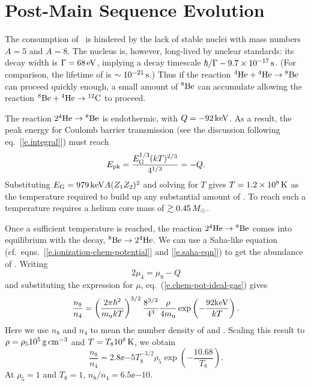 \chapter{Post-Main Sequence Evolution}

The consumption of \helium\ is hindered by the lack of stable nuclei with mass numbers $A=5$ and $A=8$.  
The nucleus \beryllium[8] is, however, long-lived by nuclear standards: its decay width is $\Gamma = 68\nsp\eV$, implying a decay timescale $\hbar/\Gamma - 9.7\ee{-17}\nsp\second$.  (For comparison, the lifetime of \lithium[5] is $\sim 10^{-21}\nsp\second$.)  Thus if the reaction $\helium[4]+\helium[4]\to\beryllium[8]$ can proceed quickly enough, a small amount of $\beryllium[8]$ can accumulate allowing the reaction $\beryllium[8]+\helium\to\carbon$ to proceed.

The reaction $2\helium\to\beryllium[8]$ is endothermic, with $Q = -92\nsp\keV$.  As a result, the peak energy for Coulomb barrier transmission (see the discussion following eq.~[\ref{e.integral}]) must reach
\[ \Epk = \frac{\EG^{1/3}(kT)^{2/3}}{4^{1/3}} = -Q. \]
Substituting $\EG = 979\nsp\keV A (Z_{1}Z_{2})^{2}$ and solving for $T$ gives $T = 1.2\ee{8}\nsp\K$ as the temperature required to build up any substantial amount of \beryllium[8].  To reach such a temperature requires a helium core mass of $\gtrsim 0.45\nsp\Msun$.

Once a sufficient temperature is reached, the reaction $2\helium[4]\to\beryllium[8]$ comes into equilibrium with the decay, $\beryllium[8]\to2\helium$.  We can use a Saha-like equation (cf.\ eqns.~[\ref{e.ionization-chem-potential}] and [\ref{e.saha-eqn}]) to get the abundance of \beryllium[8].  Writing
\[ 2\mu_{4} = \mu_{8} - Q \]
and substituting the expression for $\mu$, eq.~(\ref{e.chem-pot-ideal-gas}) gives
\begin{equation}\label{e.n8-n4}
\frac{n_{8}}{n_{4}} = \left(\frac{2\pi\hbar^{2}}{\mb kT}\right)^{3/2}\frac{8^{3/2}}{4^{3}}\frac{\rho}{4\mb}\exp\left(-\frac{92\keV}{kT}\right).
\end{equation}
Here we use $n_{8}$ and $n_{4}$ to mean the number density of \beryllium[8] and \helium.  Scaling this result to $\rho = \rho_{5} 10^{5}\nsp\grampercc$ and $T = T_{8}10^{8}\nsp\K$, we obtain
\[ \frac{n_{8}}{n_{4}} = 2.8\ee{-5} T_{8}^{-3/2}\rho_{5}\exp\left(-\frac{10.68}{T_{8}}\right). \]
At $\rho_{5}=1$ and $T_{8} = 1$, $n_{8}/n_{4} = 6.5\ee{-10}$.
